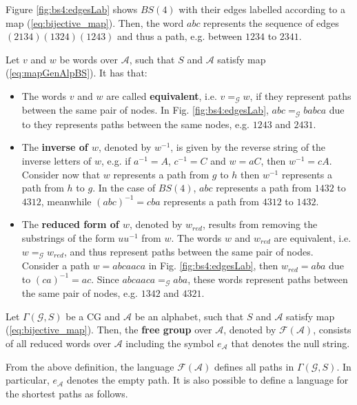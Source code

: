 Figure \ref{fig:bs4:edgesLab} shows $BS(4)$ with their edges labelled according to a map (\ref{eq:bijective_map}). Then, the word $abc$ represents the sequence of edges $(2134)(1324)(1243)$ and thus a path, e.g. between $1234$ to $2341$.

Let $v$ and $w$ be words over $\mathcal{A}$, such that $S$ and $\mathcal{A}$ satisfy map (\ref{eq:mapGenAlpBS}). It has that:
\begin{itemize}
\item The words $v$ and $w$ are called \textbf{equivalent}, i.e. $v=_\mathcal{G}w$, if they represent paths between the same pair of nodes. In Fig. \ref{fig:bs4:edgesLab}, $abc=_\mathcal{G}babca$ due to they represents paths between the same nodes, e.g. $1243$ and $2431$.
\item The \textbf{inverse of $w$}, denoted by $w^{-1}$, is given by the reverse string of the inverse letters of $w$, e.g. if $a^{-1}=A$, $c^{-1}=C$ and $w=aC$, then $w^{-1}=cA$. Consider now that $w$ represents a path from $g$ to $h$ then $w^{-1}$ represents a path from $h$ to $g$. In the case of $BS(4)$, $abc$ represents a path from $1432$ to $4312$, meanwhile $(abc)^{-1}=cba$ represents a path from $4312$ to $1432$.

\item The \textbf{reduced form of $w$}, denoted by $w_{red}$, results from removing the substrings of the form $uu^{-1}$ from $w$. The words $w$ and $w_{red}$ are equivalent, i.e. $w=_\mathcal{G}w_{red}$, and thus represent paths between the same pair of nodes. 
Consider a path $w=abcaaca$  in Fig. \ref{fig:bs4:edgesLab}, then $w_{red}=aba$ due to $(ca)^{-1}=ac$. Since $abcaaca=_\mathcal{G}aba$, these words represent paths between the same pair of nodes, e.g. $1342$ and $4321$.
\end{itemize}

\begin{definition}
Let $\Gamma(\mathcal{G},S)$ be a CG and $\mathcal{A}$ be an alphabet, such that $S$ and $\mathcal{A}$ satisfy map (\ref{eq:bijective_map}). Then, the \textbf{free group} over $\mathcal{A}$, denoted by $\mathcal{F}(\mathcal{A})$, consists of all reduced words over $\mathcal{A}$ including the symbol $e_\mathcal{A}$ that
denotes the null string. 
\end{definition}

From the above definition, the language $\mathcal{F}(\mathcal{A})$ defines all paths in $\Gamma(\mathcal{G}, S)$. In particular, $e_\mathcal{A}$ denotes the empty path. It is also possible to define a language for the shortest paths as follows.

